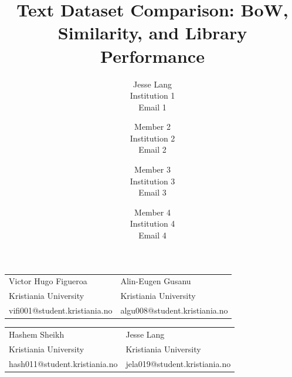 \documentclass{article}
\title{Text Dataset Comparison: BoW, Similarity, and Library Performance}
\author{
  Jesse Lang \\
  Institution 1 \\
  Email 1 \and
  Member 2 \\
  Institution 2 \\
  Email 2 \and
  Member 3 \\
  Institution 3 \\
  Email 3 \and
  Member 4 \\
  Institution 4 \\
  Email 4
}
\begin{document}
\maketitle

\begin{center}
\begin{tabular}{@{}ll}
  Victor Hugo Figueroa & Alin-Eugen Gusanu \\
  Kristiania University & Kristiania University \\
  vifi001@student.kristiania.no & algu008@student.kristiania.no
\end{tabular}
\end{center}
\begin{center}
\begin{tabular}{@{}ll}
  Hashem Sheikh & Jesse Lang \\
  Kristiania University & Kristiania University \\
  hash011@student.kristiania.no & jela019@student.kristiania.no
\end{tabular}
\end{center}
\end{document}
